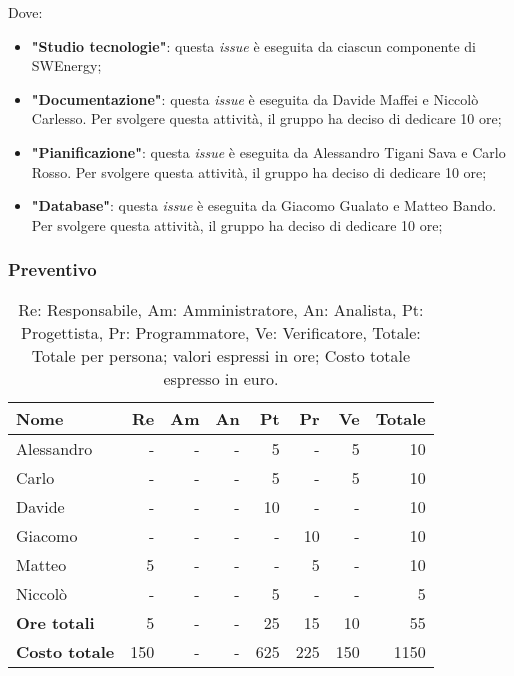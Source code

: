 Dove:
\begin{itemize}
	\item \textbf{"Studio tecnologie"}: questa \textit{issue} è eseguita da
	      ciascun componente di SWEnergy;

	\item \textbf{"Documentazione"}: questa \textit{issue} è eseguita da
	      Davide Maffei e Niccolò Carlesso. Per svolgere questa attività, il
	      gruppo ha deciso di dedicare 10 ore;

	\item \textbf{"Pianificazione"}: questa \textit{issue} è eseguita da
	      Alessandro Tigani Sava e Carlo Rosso. Per svolgere questa attività,
	      il gruppo ha deciso di dedicare 10 ore;

	\item \textbf{"Database"}: questa \textit{issue} è eseguita da
	      Giacomo Gualato e Matteo Bando. Per svolgere questa attività, il
	      gruppo ha deciso di dedicare 10 ore;
\end{itemize}

\subsubsection{Preventivo}

\begin{table}[H]
	\centering
	\begin{tabular}{l|r|r|r|r|r|r|r}
		\textbf{Nome}         & \textbf{Re} & \textbf{Am} & \textbf{An} & \textbf{Pt} & \textbf{Pr} & \textbf{Ve} & \textbf{Totale} \\
		\hline
		Alessandro            & -           & -           & -           & 5           & -           & 5           & 10              \\
		Carlo                 & -           & -           & -           & 5           & -           & 5           & 10              \\
		Davide                & -           & -           & -           & 10          & -           & -           & 10              \\
		Giacomo               & -           & -           & -           & -           & 10          & -           & 10              \\
		Matteo                & 5           & -           & -           & -           & 5           & -           & 10              \\
		Niccolò               & -           & -           & -           & 5           & -           & -           & 5               \\
		\hline
		\textbf{Ore totali}   & 5           & -           & -           & 25          & 15          & 10          & 55              \\
		\textbf{Costo totale} & 150         & -           & -           & 625         & 225         & 150         & 1150
	\end{tabular}
	\caption{Re: Responsabile, Am: Amministratore, An: Analista, Pt: Progettista,
		Pr: Programmatore, Ve: Verificatore, Totale: Totale per persona; valori espressi in ore; Costo totale espresso in euro.}
\end{table}

